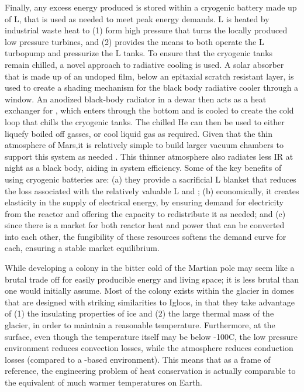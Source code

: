 \documentclass[fleqn,10pt]{Stylesheet} %
\begin{document}
Finally, any excess energy produced is stored within a cryogenic battery \cite{Hogberg2018} made up of L, that is used as needed to meet peak energy demands. L is heated by industrial waste heat to (1) form high pressure  that turns the locally produced low pressure turbines, and (2) provides the means to both operate the L turbopump and pressurize the L tanks. To ensure that the cryogenic tanks remain chilled, a novel approach to radiative cooling is used. A solar absorber that is made up of an undoped  film, below an epitaxial  scratch resistant layer, is used to create a shading mechanism for the black body radiative cooler through a  window. An anodized black-body radiator in a dewar then acts as a heat exchanger for , which enters through the bottom and is cooled to create the cold loop that chills the cryogenic tanks. The chilled He can then be used to either liquefy boiled off gasses, or cool liquid gas as required. Given that the thin atmosphere of Mars,it is relatively simple to build larger vacuum chambers to support this system as needed \cite{Chen2019}. This thinner atmosphere also radiates less IR at night as a black body, aiding in system efficiency. Some of the key benefits of using cryogenic batteries are: (a) they provide a sacrificial L blanket that reduces the loss associated with the relatively valuable L and ; (b) economically, it creates elasticity in the supply of electrical energy, by ensuring demand for electricity from the reactor and offering the capacity to redistribute it as needed; and (c) since there is a market for both reactor heat and power that can be converted into each other, the fungibility of these resources softens the demand curve for each, ensuring a stable market equilibrium.

While developing a colony in the bitter cold of the Martian pole may seem like a brutal trade off for easily producible energy and living space; it is less brutal than one would initially assume. Most of the colony exists within the glacier in domes that are designed with striking similarities to Igloos, in that they take advantage of (1) the insulating properties of ice and (2) the large thermal mass of the glacier, in order to maintain a reasonable temperature. Furthermore, at the surface, even though the temperature itself may be below -100\degree{}C, the low pressure environment reduces convection losses, while the  atmosphere reduces conduction losses (compared to a -based environment). This means that as a frame of reference, the engineering problem of heat conservation is actually comparable to the equivalent of much warmer temperatures on Earth.
\end{document}

